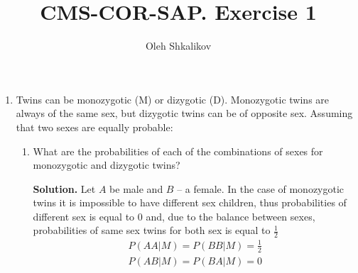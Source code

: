 \documentclass[a4paper, 12pt]{article}
\title{CMS-COR-SAP. Exercise 1}
\author{Oleh Shkalikov}
\newcommand{\task}[2]{
    \item #1

    \textbf{Solution. } #2
}
\begin{document}
\maketitle

\begin{enumerate}
    \item Twins can be monozygotic (M) or dizygotic (D). Monozygotic
          twins are always of the same sex, but dizygotic twins can be
          of opposite sex. Assuming that two sexes are equally probable:
          \begin{enumerate}
              \task{What are the probabilities of each of the combinations
                  of sexes for monozygotic and dizygotic twins?}
              {Let $A$ be male and $B$ -- a female. In the case of monozygotic
                  twins it is impossible to have different sex children, thus probabilities
                  of different sex is equal to $0$ and, due to the balance between
                  sexes, probabilities of same sex twins for both sex is equal to $\frac{1}{2}$
                  \begin{align*}
                      P(AA | M) = P(BB | M) = \frac{1}{2} \\
                      P(AB | M) = P(BA | M) = 0
                  \end{align*}

}
\end{enumerate}
\end{enumerate}
\end{document}
